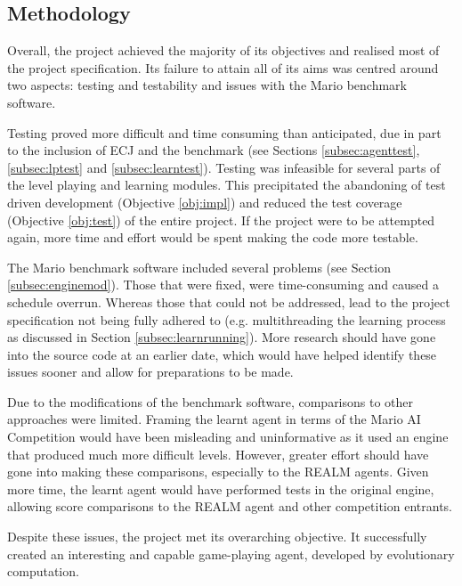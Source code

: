 
\subsection{Methodology}

Overall, the project achieved the majority of its objectives and realised most of the project specification. Its failure to attain all of its aims was centred around two aspects: testing and testability and issues with the Mario benchmark software.

Testing proved more difficult and time consuming than anticipated, due in part to the inclusion of ECJ and the benchmark (see Sections \ref{subsec:agenttest}, \ref{subsec:lptest} and \ref{subsec:learntest}). Testing was infeasible for several parts of the level playing and learning modules. This precipitated the abandoning of test driven development (Objective \ref{obj:impl}) and reduced the test coverage (Objective \ref{obj:test}) of the entire project. If the project were to be attempted again, more time and effort would be spent making the code more testable.

The Mario benchmark software included several problems (see Section \ref{subsec:enginemod}). Those that were fixed, were time-consuming and caused a schedule overrun. Whereas those that could not be addressed, lead to the project specification not being fully adhered to (e.g. multithreading the learning process as discussed in Section \ref{subsec:learnrunning}). More research should have gone into the source code at an earlier date, which would have helped identify these issues sooner and allow for preparations to be made.

Due to the modifications of the benchmark software, comparisons to other approaches were limited. Framing the learnt agent in terms of the Mario AI Competition would have been misleading and uninformative as it used an engine that produced much more difficult levels. However, greater effort should have gone into making these comparisons, especially to the REALM agents. Given more time, the learnt agent would have performed tests in the original engine, allowing score comparisons to the REALM agent and other competition entrants.

Despite these issues, the project met its overarching objective. It successfully created an interesting and capable game-playing agent, developed by evolutionary computation.





